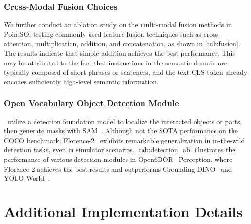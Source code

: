 \subsubsection{Cross-Modal Fusion Choices}\label{app:fusion}
We further conduct an ablation study on the multi-modal fusion methods in PointSO, testing commonly used feature fusion techniques such as cross-attention, multiplication, addition, and concatenation, as shown in \cref{tab:fusion}. The results indicate that simple addition achieves the best performance. This may be attributed to the fact that instructions in the semantic domain are typically composed of short phrases or sentences, and the text CLS token already encodes sufficiently high-level semantic information.



\subsubsection{Open Vocabulary Object Detection Module}
\sofar~utilize a detection foundation model to localize the interacted objects or parts, then generate masks with SAM~\cite{SAM23}. Although not the SOTA performance on the COCO benchmark, Florence-2~\cite{florence2} exhibits remarkable generalization in in-the-wild detection tasks, even in simulator scenarios. \cref{tab:detection_ab} illustrates the performance of various detection modules in Open6DOR~\cite{Open6DOR24} Perception, where Florence-2 achieves the best results and outperforms Grounding DINO~\cite{groundingdino23} and YOLO-World~\cite{yoloworld24}.

\vspace{3pt}
\section{Additional Implementation Details}\label{app:implementation_details}

